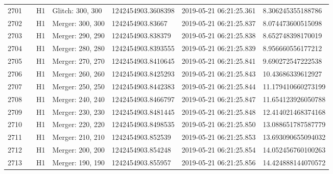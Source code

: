 \begin{longtable}{lllllll}
2701 &                                                    &       H1 &  Glitch: 300, 300 &  1242454903.3608398 &  2019-05-21 06:21:25.361 &   8.306245355188786 \\
2702 &                                                    &       H1 &  Merger: 300, 300 &    1242454903.83667 &  2019-05-21 06:21:25.837 &   8.074473600515098 \\
2703 &                                                    &       H1 &  Merger: 290, 290 &   1242454903.838379 &  2019-05-21 06:21:25.838 &   8.652748398170019 \\
2704 &                                                    &       H1 &  Merger: 280, 280 &  1242454903.8393555 &  2019-05-21 06:21:25.839 &   8.956660556177212 \\
2705 &                                                    &       H1 &  Merger: 270, 270 &  1242454903.8410645 &  2019-05-21 06:21:25.841 &   9.690272547222538 \\
2706 &                                                    &       H1 &  Merger: 260, 260 &  1242454903.8425293 &  2019-05-21 06:21:25.843 &   10.43686339612927 \\
2707 &                                                    &       H1 &  Merger: 250, 250 &  1242454903.8442383 &  2019-05-21 06:21:25.844 &  11.179410660273199 \\
2708 &                                                    &       H1 &  Merger: 240, 240 &  1242454903.8466797 &  2019-05-21 06:21:25.847 &  11.654123926050788 \\
2709 &                                                    &       H1 &  Merger: 230, 230 &  1242454903.8481445 &  2019-05-21 06:21:25.848 &  12.414021468374168 \\
2710 &                                                    &       H1 &  Merger: 220, 220 &  1242454903.8498535 &  2019-05-21 06:21:25.850 &  13.088651787587779 \\
2711 &                                                    &       H1 &  Merger: 210, 210 &   1242454903.852539 &  2019-05-21 06:21:25.853 &  13.693090655094032 \\
2712 &                                                    &       H1 &  Merger: 200, 200 &   1242454903.854248 &  2019-05-21 06:21:25.854 &  14.052456760100263 \\
2713 &                                                    &       H1 &  Merger: 190, 190 &   1242454903.855957 &  2019-05-21 06:21:25.856 &  14.424888144070572 \\

\end{longtable}
